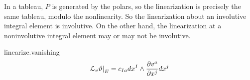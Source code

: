 In a tableau, \(P\) is generated by the polars, so the linearization is precisely the same tableau, modulo the nonlinearity.
So the linearization about an involutive integral element is involutive.
On the other hand, the linearization at a noninvolutive integral element may or may not be involutive.
\begin{answer}{linearize.vanishing}
\[
\left.\LieDer_v \vartheta\right|_E = c_{Ia} dx^I \wedge \pderiv{v^a}{x^j} dx^j
\]
\end{answer}

